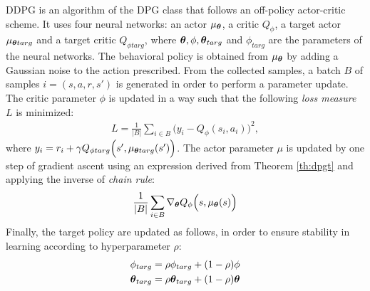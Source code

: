 \newline
\acf{DDPG} is an algorithm of the \ac{DPG} class that follows an off-policy actor-critic scheme. It uses four neural networks: an actor $\mu_{\boldsymbol{\theta}}$, a critic $Q_{\phi}$, a target actor $\mu_{\boldsymbol{\theta} targ}$ and a target critic $Q_{\phi targ}$, where $\boldsymbol{\theta}, \phi, \boldsymbol{\theta}_{targ}$ and $\phi_{targ}$ are the parameters of the neural networks. The behavioral policy is obtained from $\mu_{\boldsymbol{\theta}}$ by adding a Gaussian noise to the action prescribed. From the collected samples, a batch $B$ of samples $i = (s,a,r,s')$ is generated in order to perform a parameter update.\\
\newline
The critic parameter $\phi$ is updated in a way such that the following \emph{loss measure} $L$ is minimized:
\begin{align}
	L = \frac{1}{|B|} \sum_{i \in B}\Big(y_i - Q_{\phi}(s_i, a_i) \Big)^2,
\end{align}
where $y_i = r_i + \gamma Q_{\phi targ}\Big(s', \mu_{\boldsymbol{\theta} targ}(s')\Big)$. The actor parameter $\mu$ is updated by one step of gradient ascent using an expression derived from Theorem \ref{th:dpgt} and applying the inverse of \emph{chain rule}:
\begin{align}
	\frac{1}{|B|}\sum_{i \in B}\nabla_{\boldsymbol{\theta}}Q_{\phi}\Big(s, \mu_{\boldsymbol{\theta}}(s)\Big)
\end{align}
Finally, the target policy are updated as follows, in order to ensure stability in learning according to hyperparameter $\rho$:
\begin{align}
	\phi_{targ} &= \rho \phi_{targ} + (1 - \rho) \phi\\
	\boldsymbol{\theta}_{targ} &= \rho \boldsymbol{\theta}_{targ} + (1 - \rho) \boldsymbol{\theta}
\end{align}

